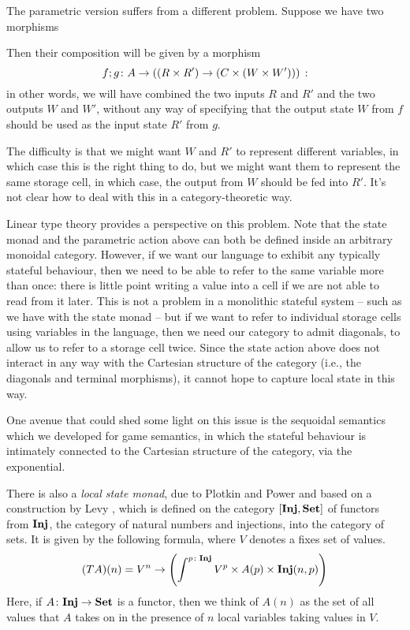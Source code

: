 The parametric version suffers from a different problem.  
Suppose we have two \Mellies morphisms
Then their composition will be given by a \Mellies morphism
\[
  f;g \colon A \to ((R \times R') \to (C \times (W \times W')))\,:
  \]
in other words, we will have combined the two inputs $R$ and $R'$ and the two outputs $W$ and $W'$, without any way of specifying that the output state $W$ from $f$ should be used as the input state $R'$ from $g$.

The difficulty is that we might want $W$ and $R'$ to represent different variables, in which case this is the right thing to do, but we might want them to represent the same storage cell, in which case, the output from $W$ should be fed into $R'$.  
It's not clear how to deal with this in a category-theoretic way.

Linear type theory provides a perspective on this problem.  
Note that the state monad and the parametric action above can both be defined inside an arbitrary monoidal category.  
However, if we want our language to exhibit any typically stateful behaviour, then we need to be able to refer to the same variable more than once: there is little point writing a value into a cell if we are not able to read from it later.  
This is not a problem in a monolithic stateful system -- such as we have with the state monad -- but if we want to refer to individual storage cells using variables in the language, then we need our category to admit diagonals, to allow us to refer to a storage cell twice.
Since the state action above does not interact in any way with the Cartesian structure of the category (i.e., the diagonals and terminal morphisms), it cannot hope to capture local state in this way.

One avenue that could shed some light on this issue is the sequoidal semantics which we developed for game semantics, in which the stateful behaviour is intimately connected to the Cartesian structure of the category, via the exponential.

There is also a \emph{local state monad}, due to Plotkin and Power \cite{PlotkinPower} and based on a construction by Levy \cite{PaulsThesis}, which is defined on the category $[{\normalfont\textbf{Inj}},{\normalfont\textbf{Set}}]$ of functors from ${\normalfont\textbf{Inj}}$, the category of natural numbers and injections, into the category of sets.  
It is given by the following formula, where $V$ denotes a fixes set of values.
\[
  (TA)(n) = V^n \to \left( \int^{p\colon{\normalfont\textbf{Inj}}} V^p \times A(p) \times {\normalfont\textbf{Inj}}(n, p) \right)
  \]
Here, if $A \colon {\normalfont\textbf{Inj}} \to {\normalfont\textbf{Set}}$ is a functor, then we think of $A(n)$ as the set of all values that $A$ takes on in the presence of $n$ local variables taking values in $V$.

